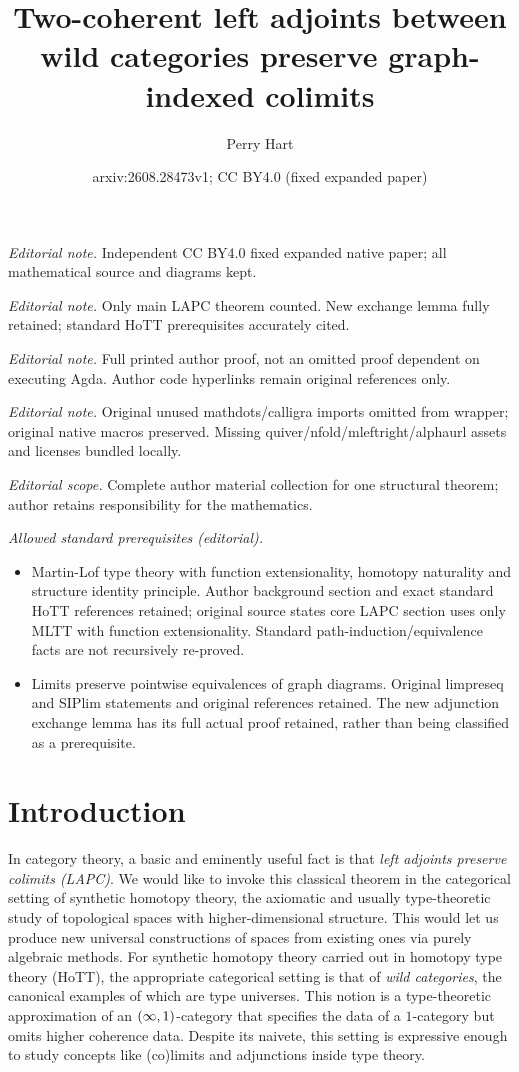 \documentclass[10pt,a4paper]{article}
\title{Two-coherent left adjoints between wild categories preserve graph-indexed colimits}
\author{Perry Hart}
\date{arxiv:2608.28473v1; CC BY4.0 (fixed expanded paper)}
\theoremstyle{definition}
\theoremstyle{remark}
\newcommand{\0}{\mathbf{0}}
\newcommand{\1}{\mathbf{1}}
\newcommand{\2}{\mathbf{2}}
\begin{document}
\maketitle
\noindent\textit{Editorial note.} Independent CC BY4.0 fixed expanded native paper; all mathematical source and diagrams kept.\par\medskip
\noindent\textit{Editorial note.} Only main LAPC theorem counted. New exchange lemma fully retained; standard HoTT prerequisites accurately cited.\par\medskip
\noindent\textit{Editorial note.} Full printed author proof, not an omitted proof dependent on executing Agda. Author code hyperlinks remain original references only.\par\medskip
\noindent\textit{Editorial note.} Original unused mathdots/calligra imports omitted from wrapper; original native macros preserved. Missing quiver/nfold/mleftright/alphaurl assets and licenses bundled locally.\par\medskip
\noindent\textit{Editorial scope.} Complete author material collection for one structural theorem; author retains responsibility for the mathematics.\par\medskip
\noindent\textit{Allowed standard prerequisites (editorial).}\begin{itemize}
\item Martin-Lof type theory with function extensionality, homotopy naturality and structure identity principle. Author background section and exact standard HoTT references retained; original source states core LAPC section uses only MLTT with function extensionality. Standard path-induction/equivalence facts are not recursively re-proved.
\item Limits preserve pointwise equivalences of graph diagrams. Original limpreseq and SIPlim statements and original references retained. The new adjunction exchange lemma has its full actual proof retained, rather than being classified as a prerequisite.
\end{itemize}\medskip
\section{Introduction}\label{sec:intro} 

In category theory, a basic and eminently useful fact is that \emph{left adjoints preserve colimits (LAPC)}. We would like to invoke this classical theorem in the categorical setting of synthetic homotopy theory, the axiomatic and usually type-theoretic study of topological spaces with higher-dimensional structure. This would let us produce new universal constructions of spaces from existing ones via purely algebraic methods. For synthetic homotopy theory carried out in homotopy type theory (HoTT), the appropriate categorical setting is that of \emph{wild categories}, the canonical examples of which are type universes. This notion is a type-theoretic approximation of an $\mleft(\infty,1\mright)$-category that specifies the data of a $1$-category but omits higher coherence data. Despite its naivete, this setting is expressive enough to study concepts like (co)limits and adjunctions inside type theory. 
\end{document}
